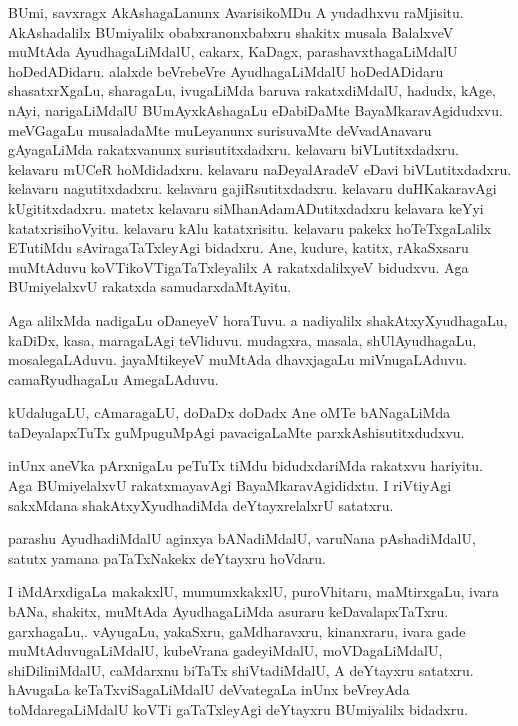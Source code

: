 \documentclass{article}
\begin{document}
\begin{mng}%
BUmi, savxragx AkAshagaLanunx AvarisikoMDu A yudadhxvu raMjisitu. AkAshadalilx BUmiyalilx 
obabxranonxbabxru shakitx musala BalalxveV muMtAda AyudhagaLiMdalU, cakarx, KaDagx, 
parashavxthagaLiMdalU hoDedADidaru. alalxde beVrebeVre AyudhagaLiMdalU hoDedADidaru shasatxrXgaLu, 
sharagaLu, ivugaLiMda baruva rakatxdiMdalU, hadudx, kAge, nAyi, narigaLiMdalU BUmAyxkAshagaLu 
eDabiDaMte BayaMkaravAgidudxvu. meVGagaLu musaladaMte muLeyanunx surisuvaMte deVvadAnavaru 
gAyagaLiMda rakatxvanunx surisutitxdadxru. kelavaru biVLutitxdadxru. kelavaru mUCeR hoMdidadxru. 
kelavaru naDeyalAradeV eDavi biVLutitxdadxru. kelavaru nagutitxdadxru. kelavaru gajiRsutitxdadxru. 
kelavaru duHKakaravAgi kUgititxdadxru. matetx kelavaru siMhanAdamADutitxdadxru kelavara keYyi 
katatxrisihoVyitu. kelavaru kAlu katatxrisitu. kelavaru pakekx hoTeTxgaLalilx ETutiMdu 
sAviragaTaTxleyAgi bidadxru. Ane, kudure, katitx, rAkaSxsaru muMtAduvu koVTikoVTigaTaTxleyalilx A 
rakatxdalilxyeV bidudxvu. Aga BUmiyelalxvU rakatxda samudarxdaMtAyitu.
\end{mng}

\begin{mng}%
Aga alilxMda nadigaLu oDaneyeV horaTuvu. a nadiyalilx shakAtxyXyudhagaLu, kaDiDx, kasa, maragaLAgi 
teVliduvu. mudagxra, masala, shUlAyudhagaLu, mosalegaLAduvu. jayaMtikeyeV muMtAda dhavxjagaLu 
miVnugaLAduvu. camaRyudhagaLu AmegaLAduvu.
\end{mng}

\begin{mng}%
kUdalugaLU, cAmaragaLU, doDaDx doDadx Ane oMTe bANagaLiMda taDeyalapxTuTx guMpuguMpAgi 
pavacigaLaMte parxkAshisutitxdudxvu.
\end{mng}

\begin{mng}%
inUnx aneVka pArxnigaLu peTuTx tiMdu bidudxdariMda rakatxvu hariyitu. Aga BUmiyelalxvU 
rakatxmayavAgi BayaMkaravAgididxtu. I riVtiyAgi sakxMdana shakAtxyXyudhadiMda deYtayxrelalxrU 
satatxru.
\end{mng}

\begin{mng}%
parashu AyudhadiMdalU aginxya bANadiMdalU, varuNana pAshadiMdalU, satutx yamana paTaTxNakekx 
deYtayxru hoVdaru.
\end{mng}

\begin{mng}%
I iMdArxdigaLa makakxlU, mumumxkakxlU, puroVhitaru, maMtirxgaLu, ivara bANa, shakitx, muMtAda 
AyudhagaLiMda asuraru keDavalapxTaTxru. garxhagaLu,. vAyugaLu, yakaSxru, gaMdharavxru, kinanxraru, 
ivara gade muMtAduvugaLiMdalU, kubeVrana gadeyiMdalU, moVDagaLiMdalU, shiDiliniMdalU, caMdarxnu 
biTaTx shiVtadiMdalU, A deYtayxru satatxru. hAvugaLa keTaTxviSagaLiMdalU deVvategaLa inUnx 
beVreyAda toMdaregaLiMdalU koVTi gaTaTxleyAgi deYtayxru BUmiyalilx bidadxru.
\end{mng}
\end{document}
